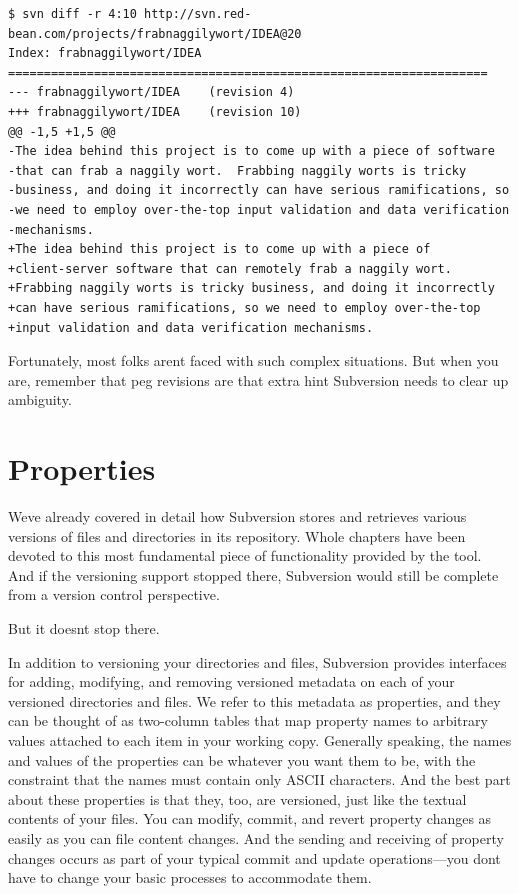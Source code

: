 \begin{verbatim}
$ svn diff -r 4:10 http://svn.red-bean.com/projects/frabnaggilywort/IDEA@20
Index: frabnaggilywort/IDEA
===================================================================
--- frabnaggilywort/IDEA    (revision 4)
+++ frabnaggilywort/IDEA    (revision 10)
@@ -1,5 +1,5 @@
-The idea behind this project is to come up with a piece of software
-that can frab a naggily wort.  Frabbing naggily worts is tricky
-business, and doing it incorrectly can have serious ramifications, so
-we need to employ over-the-top input validation and data verification
-mechanisms.
+The idea behind this project is to come up with a piece of
+client-server software that can remotely frab a naggily wort.
+Frabbing naggily worts is tricky business, and doing it incorrectly
+can have serious ramifications, so we need to employ over-the-top
+input validation and data verification mechanisms.
\end{verbatim}

Fortunately, most folks aren\textquotesingle t faced with such complex
situations. But when you are, remember that peg revisions are that extra
hint Subversion needs to clear up ambiguity.

\section{Properties}\label{svn.advanced.props}

We\textquotesingle ve already covered in detail how Subversion stores
and retrieves various versions of files and directories in its
repository. Whole chapters have been devoted to this most fundamental
piece of functionality provided by the tool. And if the versioning
support stopped there, Subversion would still be complete from a version
control perspective.

But it doesn\textquotesingle t stop there.

In addition to versioning your directories and files, Subversion
provides interfaces for adding, modifying, and removing versioned
metadata on each of your versioned directories and files. We refer to
this metadata as properties, and they can be thought of as two-column
tables that map property names to arbitrary values attached to each item
in your working copy. Generally speaking, the names and values of the
properties can be whatever you want them to be, with the constraint that
the names must contain only ASCII characters. And the best part about
these properties is that they, too, are versioned, just like the textual
contents of your files. You can modify, commit, and revert property
changes as easily as you can file content changes. And the sending and
receiving of property changes occurs as part of your typical commit and
update operations---you don\textquotesingle t have to change your basic
processes to accommodate them.

